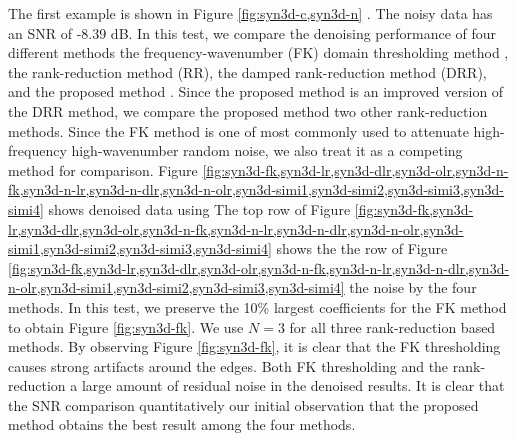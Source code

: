 The first example is shown in Figure \ref{fig:syn3d-c,syn3d-n} . The noisy data has an SNR of -8.39 dB. In this test, we compare the denoising performance of four different methods\wen{:} the frequency-wavenumber (FK) domain thresholding method \cite[]{arazthesis,abma2015}, the rank-reduction method (RR), the damped rank-reduction method (DRR), and the proposed method .  Since the proposed method is an improved version of the DRR method, we compare the proposed method  two other rank-reduction methods. Since the FK method is one of most commonly used  to attenuate high-frequency high-wavenumber random noise, we also treat it as a competing method for  comparison. Figure \ref{fig:syn3d-fk,syn3d-lr,syn3d-dlr,syn3d-olr,syn3d-n-fk,syn3d-n-lr,syn3d-n-dlr,syn3d-n-olr,syn3d-simi1,syn3d-simi2,syn3d-simi3,syn3d-simi4} shows denoised data using  The top row of Figure \ref{fig:syn3d-fk,syn3d-lr,syn3d-dlr,syn3d-olr,syn3d-n-fk,syn3d-n-lr,syn3d-n-dlr,syn3d-n-olr,syn3d-simi1,syn3d-simi2,syn3d-simi3,syn3d-simi4} shows the  the  row of Figure \ref{fig:syn3d-fk,syn3d-lr,syn3d-dlr,syn3d-olr,syn3d-n-fk,syn3d-n-lr,syn3d-n-dlr,syn3d-n-olr,syn3d-simi1,syn3d-simi2,syn3d-simi3,syn3d-simi4}  the noise  by the four methods. In this test, we preserve the 10\% largest coefficients for the FK method to obtain Figure \ref{fig:syn3d-fk}. We use  $N=3$ for all three rank-reduction based methods. By observing Figure \ref{fig:syn3d-fk}, it is clear that the FK thresholding causes strong artifacts around the edges. Both FK thresholding and the rank-reduction   a large amount of residual noise in the denoised results.   It is clear that the SNR comparison quantitatively  our initial observation that the proposed method obtains the best result among the four methods.  
